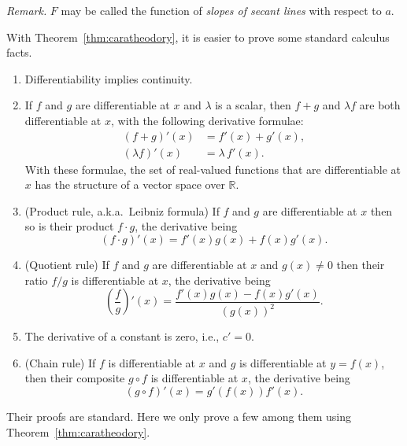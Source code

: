 \noindent \textit{Remark.} $F$ may be called the function of \textit{slopes of secant lines} with respect to $a$.

With Theorem~\ref{thm:caratheodory}, it is easier to prove some standard calculus facts.

\begin{thm}
  \begin{enumerate}[(1)]
    \item Differentiability implies continuity.

    \item If $f$ and $g$ are differentiable at $x$ and $\lambda$ is a scalar, then $f+g$ and $\lambda f$ are both differentiable at $x$, with the following derivative formulae:
      \begin{align*}
	(f + g)'(x) &= f'(x) + g'(x), \\
	(\lambda f)'(x) &= \lambda \, f'(x).
      \end{align*}
      With these formulae, the set of real-valued functions that are differentiable at $x$ has the structure of a vector space over $\mathbb{R}$.

    \item (Product rule, a.k.a.~Leibniz formula)
      If $f$ and $g$ are differentiable at $x$ then so is their product $f \cdot g$, the derivative being
      \[
	(f \cdot g)'(x) = f'(x) g(x) + f(x) g'(x).
      \]

    \item (Quotient rule) If $f$ and $g$ are differentiable at $x$ and $g(x) \ne 0$ then their ratio $f/g$ is differentiable at $x$, the derivative being
      \[
	\left( \frac{f}{g} \right)'(x) = \frac{f'(x) g(x) - f(x) g'(x)}{(g(x))^2}.
      \]
      
    \item The derivative of a constant is zero, i.e., $c' = 0$.

    \item (Chain rule) If $f$ is differentiable at $x$ and $g$ is differentiable at $y = f(x)$, then their composite $g \circ f$ is differentiable at $x$, the derivative being
      \[
	(g \circ f)'(x) = g'(f(x)) f'(x).
      \]
  \end{enumerate}
\end{thm}

Their proofs are standard.  Here we only prove a few among them using Theorem~\ref{thm:caratheodory}.

